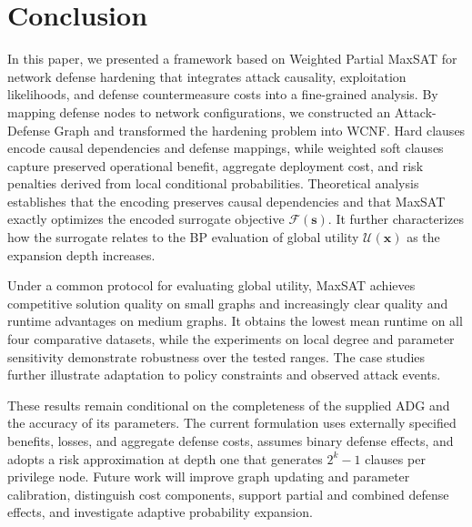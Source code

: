 \documentclass[conference]{IEEEtran}
\theoremstyle{definition} %
\theoremstyle{plain} %
\begin{document}
\section{Conclusion}
\label{sec:conclusion}

{\color{red}
In this paper, we presented a framework based on Weighted Partial MaxSAT for network defense hardening that integrates attack causality, exploitation likelihoods, and defense countermeasure costs into a fine-grained analysis. By mapping defense nodes to network configurations, we constructed an Attack-Defense Graph and transformed the hardening problem into WCNF. Hard clauses encode causal dependencies and defense mappings, while weighted soft clauses capture preserved operational benefit, aggregate deployment cost, and risk penalties derived from local conditional probabilities. Theoretical analysis establishes that the encoding preserves causal dependencies and that MaxSAT exactly optimizes the encoded surrogate objective $\mathcal{F}(\mathbf{s})$. It further characterizes how the surrogate relates to the BP evaluation of global utility $\mathcal{U}(\mathbf{x})$ as the expansion depth increases.

Under a common protocol for evaluating global utility, MaxSAT achieves competitive solution quality on small graphs and increasingly clear quality and runtime advantages on medium graphs. It obtains the lowest mean runtime on all four comparative datasets, while the experiments on local degree and parameter sensitivity demonstrate robustness over the tested ranges. The case studies further illustrate adaptation to policy constraints and observed attack events.

These results remain conditional on the completeness of the supplied ADG and the accuracy of its parameters. The current formulation uses externally specified benefits, losses, and aggregate defense costs, assumes binary defense effects, and adopts a risk approximation at depth one that generates $2^k-1$ clauses per privilege node. Future work will improve graph updating and parameter calibration, distinguish cost components, support partial and combined defense effects, and investigate adaptive probability expansion.
}





\end{document}
